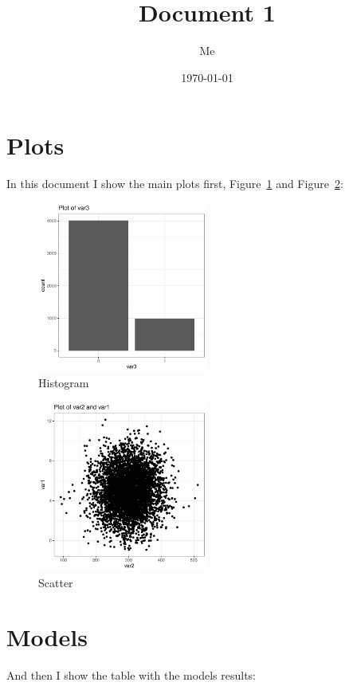 \documentclass[notitlepage]{article}
\title{Document 1}
\author{Me}
\date{\today}
\begin{document}
\maketitle

\clearpage
\section{Plots}

In this document I show the main plots first, Figure~\ref{fig1} and Figure~\ref{fig2}:

\begin{figure}[htb!]
  \centering

  \includegraphics[width = 0.5\textwidth]{../plots/output/histogram}

  \caption{Histogram}\label{fig1}
\end{figure}

\begin{figure}[htb!]
  \centering

  \includegraphics[width = 0.5\textwidth]{../plots/output/scatterplot}

  \caption{Scatter}\label{fig2}
\end{figure}

\clearpage
\section{Models}

And then I show the table with the models results:


\end{document}
